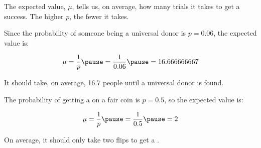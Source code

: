 \documentclass{beamer}
\begin{document}
\begin{frame}
  \begin{note}
    The expected value, $\mu$, tells us, on average, how many trials it takes to get a success. The higher $p$, the fewer it takes.
  \end{note}\pause
  
  \begin{example}
    Since the probability of someone being a universal donor is $p=0.06$, the expected value is:

    \vspace{-3mm}
    \begin{equation*}
      \begin{aligned}
        \mu = \dfrac{1}{p}\pause
        = \dfrac{1}{0.06}\pause
        = 16.666666667
      \end{aligned}
    \end{equation*}\pause

    \vspace{-4mm}
    It should take, on average, 16.7 people until a universal donor is found.
  \end{example}\pause

  \begin{example}
    The probability of getting a  on a fair coin is $p=0.5$, so the expected value is:

    \vspace{-3mm}
    \begin{equation*}
      \begin{aligned}
        \mu = \dfrac{1}{p}\pause
        = \dfrac{1}{0.5}\pause
        = 2
      \end{aligned}
    \end{equation*}\pause

    \vspace{-4mm}
    On average, it should only take two flips to get a .
  \end{example}
\end{frame}
\end{document}
